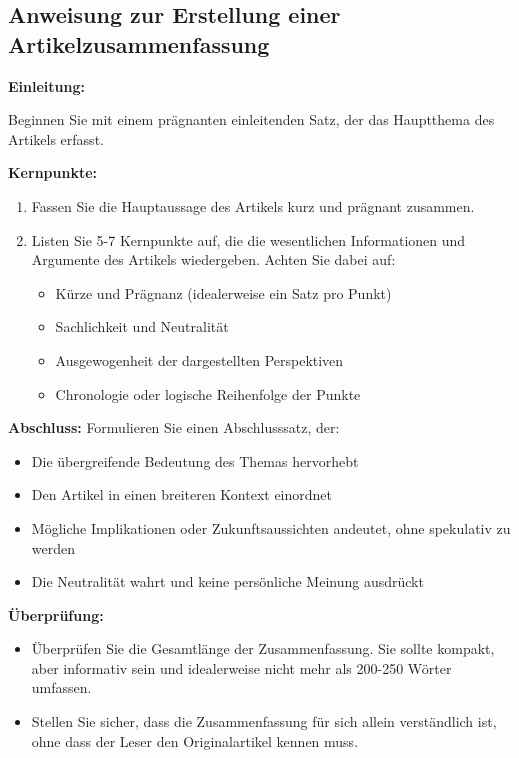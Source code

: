 \documentclass{vorlage-design-main}
\begin{document}
\subsection{Anweisung zur Erstellung einer
Artikelzusammenfassung}\label{anweisung-zur-erstellung-einer-artikelzusammenfassung}

\textbf{Einleitung:}

Beginnen Sie mit einem prägnanten einleitenden Satz, der das Hauptthema
des Artikels erfasst.

\textbf{Kernpunkte:}

\begin{enumerate}
\def\labelenumi{\arabic{enumi}.}

\item
  Fassen Sie die Hauptaussage des Artikels kurz und prägnant zusammen.
\item
  Listen Sie 5-7 Kernpunkte auf, die die wesentlichen Informationen und
  Argumente des Artikels wiedergeben. Achten Sie dabei auf:

  \begin{itemize}

  \item
    Kürze und Prägnanz (idealerweise ein Satz pro Punkt)
  \item
    Sachlichkeit und Neutralität
  \item
    Ausgewogenheit der dargestellten Perspektiven
  \item
    Chronologie oder logische Reihenfolge der Punkte
  \end{itemize}
\end{enumerate}

\textbf{Abschluss:} Formulieren Sie einen Abschlusssatz, der:

\begin{itemize}

\item
  Die übergreifende Bedeutung des Themas hervorhebt
\item
  Den Artikel in einen breiteren Kontext einordnet
\item
  Mögliche Implikationen oder Zukunftsaussichten andeutet, ohne
  spekulativ zu werden
\item
  Die Neutralität wahrt und keine persönliche Meinung ausdrückt
\end{itemize}

\textbf{Überprüfung:}

\begin{itemize}

\item
  Überprüfen Sie die Gesamtlänge der Zusammenfassung. Sie sollte
  kompakt, aber informativ sein und idealerweise nicht mehr als 200-250
  Wörter umfassen.
\item
  Stellen Sie sicher, dass die Zusammenfassung für sich allein
  verständlich ist, ohne dass der Leser den Originalartikel kennen muss.
\end{itemize}
\end{document}
